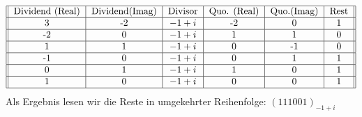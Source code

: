 \documentclass[course=erap]{aspdoc}
\begin{document}
\begin{align*}
\begin{tabular}{||c|c | c| c| c | c ||}
     \hline
     Dividend (Real) & Dividend(Imag) & Divisor & Quo. (Real) & Quo.(Imag) & Rest\\
     \hline
     3 & -2 & $-1  + i$ & -2 & 0 & 1\\
     \hline
     -2 & 0 & $-1  + i$ & 1 & 1 & 0\\
     \hline
     1 & 1 & $-1  + i$ & 0 & -1 & 0\\
     \hline
     -1 & 0 & $-1  + i$ & 0 & 1 & 1\\
     \hline
     0 & 1 & $-1  + i$ & 1 & 0 & 1\\
     \hline
     1 & 0 & $-1  + i$ & 0 & 0 & 1\\
     \hline
\end{tabular}
\end{align*}
Als Ergebnis lesen wir die Reste in umgekehrter Reihenfolge: $(111001)_{-1 + i}$
\end{document}

